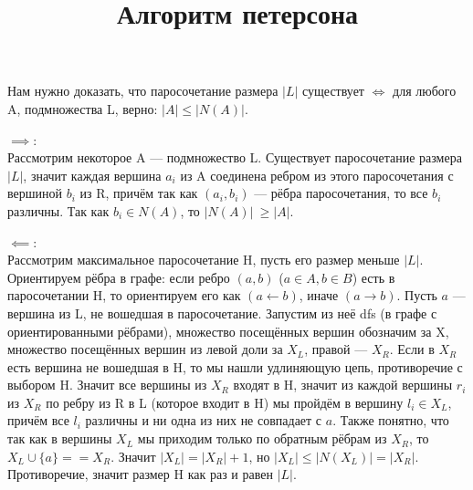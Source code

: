 \documentclass{article}
\title{Алгоритм петерсона}
\begin{document}
\Large

Нам нужно доказать, что паросочетание размера $|L|$ существует $\iff$ для любого A, подмножества L, верно: $|A| \leqslant |N(A)|$. 

$\implies$:\\
Рассмотрим некоторое A --- подмножество L. Существует паросочетание размера $|L|$, значит каждая вершина $a_i$ из A соединена ребром из этого паросочетания с вершиной $b_i$ из R, причём так как $(a_i, b_i)$ --- рёбра паросочетания, то все $b_i$ различны. Так как $b_i \in N(A)$, то $|N(A)| \ \geqslant |A|$.

$\impliedby$:\\
Рассмотрим максимальное паросочетание H, пусть его размер меньше $|L|$.  Ориентируем рёбра в графе: если ребро $(a, b)$ ($a \in A, b \in B$) есть в паросочетании H, то ориентируем его как $(a \leftarrow b)$, иначе $(a \rightarrow b)$. Пусть $a$ --- вершина из L, не вошедшая в паросочетание. Запустим из неё dfs (в графе с ориентированными рёбрами), множество посещённых вершин обозначим за X, множество посещённых вершин из левой доли за $X_L$, правой --- $X_R$. Если в $X_R$ есть вершина не вошедшая в H, то мы нашли удлиняющую цепь, противоречие с выбором H. Значит все вершины из $X_R$ входят в H, значит из каждой вершины $r_i$ из $X_R$ по ребру из R в L (которое входит в H) мы пройдём в вершину $l_i \in X_L$, причём все $l_i$ различны и ни одна из них не совпадает с $a$. Также понятно, что так как в вершины $X_L$ мы приходим только по обратным рёбрам из $X_R$, то $X_L \cup \{a\} == X_R$. Значит $|X_L| = |X_R| + 1$, но $|X_L| \leqslant |N(X_L)| = |X_R|$. Противоречие, значит размер H как раз и равен $|L|$.
\end{document}
